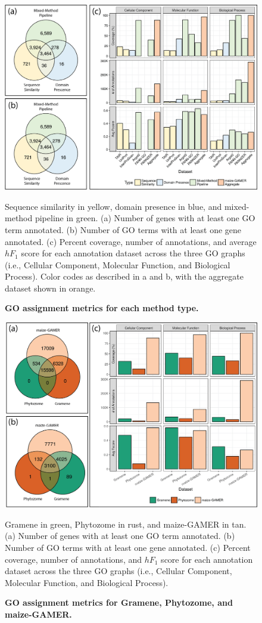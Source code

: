 \begin{figure}[htp]
  \centering
  \includegraphics[width=\textwidth]{figures/figure3/figure3.png}
  \caption{\textbf{GO assignment metrics for each method type.}}
  \raggedright
  Sequence similarity in yellow, domain presence in blue, and mixed-method pipeline in green. (a) Number of genes with at least one GO term annotated.  (b) Number of GO terms with at least one gene annotated. (c) Percent coverage, number of annotations, and average $hF_1$ score for each annotation dataset across the three GO graphs (i.e., Cellular Component, Molecular Function, and Biological Process). Color codes as described in a and b, with the aggregate dataset shown in orange.
  \label{fig:maize_gam_eval}
\end{figure}

\begin{figure}[htp]
  \centering
  \includegraphics[width=\textwidth]{figures/figure4/figure4.png}
  \caption{\textbf{GO assignment metrics for Gramene, Phytozome, and maize-GAMER.}}
  \raggedright
  Gramene in green, Phytozome in rust, and maize-GAMER in tan. (a) Number of genes with at least one GO term annotated.  (b) Number of GO terms with at least one gene annotated. (c) Percent coverage, number of annotations, and $hF_1$ score for each annotation dataset across the three GO graphs (i.e., Cellular Component, Molecular Function, and Biological Process).
  \label{fig:maize_dataset_eval}
\end{figure}


